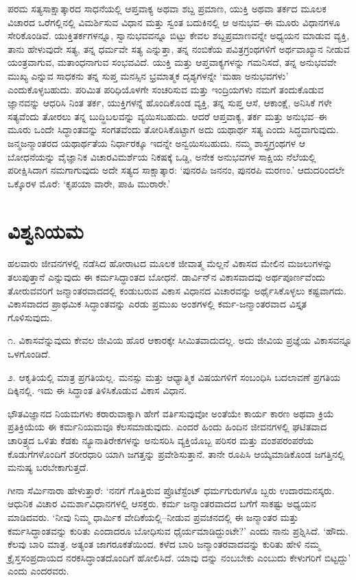 ಪರಮ ಸತ್ಯಸಾಕ್ಷಾತ್ಕಾರದ ಸಾಧನೆಯಲ್ಲಿ ಆಪ್ತವಾಕ್ಯ ಅಥವಾ ಶಬ್ದ ಪ್ರಮಾಣ, ಯುಕ್ತಿ ಅಥವಾ ತರ್ಕದ ಮೂಲಕ ವಿಚಾರದ ಒರೆಗಲ್ಲಿನಲ್ಲಿ ವಿಮರ್ಶಿಸುವ ವಿಧಾನ ಮತ್ತು ಸ್ವಂತ ಬದುಕಿನಲ್ಲಿ ಆ ಅನುಭವ–ಈ ಮೂರು ವಿಧಾನಗಳೂ ಸೇರಿಕೊಂಡಿವೆ. ಯುಕ್ತಿತರ್ಕಗಳನ್ನೂ, ಸ್ವಾನುಭವವನ್ನೂ ಬಿಟ್ಟು ಕೇವಲ ಶಬ್ದಪ್ರಮಾಣವನ್ನೇ ಅಧ್ಯಯನ ಮಾಡುವ ವ್ಯಕ್ತಿ, ತಾನು ಹೇಳುವುದೇ ಸತ್ಯ, ತನ್ನ ಧರ್ಮವೇ ಸತ್ಯ ಎನ್ನುತ್ತಾ, ತನ್ನ ನಂಬಿಕೆಯ ಪವಿತ್ರಗ್ರಂಥಗಳಿಗೆ ಅರ್ಥವಾಖ್ಯಾನ ನೀಡುವ ಯಂತ್ರವಾಗುವ, ಮತಾಂಧನಾಗುವ ಸಂಭವವಿದೆ. ಯುಕ್ತಿ ಮತ್ತು ಆಪ್ತವಾಕ್ಯಗಳನ್ನು ಗಮನಿಸದೆ, ತನ್ನ ಅನುಭವವೇ ಮುಖ್ಯ ಎನ್ನುವ ಸಾಧಕನು ತನ್ನ ಸುಪ್ತ ಮನಸ್ಸಿನ ಭ್ರಮಾತ್ಮಕ ದೃಶ್ಯಗಳನ್ನೇ ‘ಮಹಾ ಅನುಭವಗಳು’ ಎಂದುಕೊಳ್ಳಬಹುದು. ಪರಿಮಿತ ಪರಿಧಿಯೊಳಗೇ ಸಂಚರಿಸುವ ಮತ್ತು ಇಂದ್ರಿಯಗಳು ನಮಗೆ ತಂದುಕೊಡುವ ಜ್ಞಾನವನ್ನು ಆಧರಿಸಿ ನಿಂತ ತರ್ಕ, ಯುಕ್ತಿಗಳನ್ನೆ ಹೊಂದಿಕೊಂಡ ವ್ಯಕ್ತಿ, ತನ್ನ ಸುಪ್ತ ಆಸೆ, ಆಕಾಂಕ್ಷೆ, ಅನಿಸಿಕೆ ಗಳೇ ಸತ್ಯವೆಂದು ತೋರಲು ತನ್ನ ಬುದ್ಧಿಬಲವನ್ನು ವ್ಯಯಿಸಬಹುದು. ಆದರೆ ಆಪ್ತವಾಕ್ಯ, ತರ್ಕ ಮತ್ತು ಅನುಭವ–ಈ ಮೂರು ಒಂದೇ ಸಿದ್ಧಾಂತವನ್ನು ಸಂಗತವೆಂದು ತೋರಿಸಿಕೊಟ್ಟಾಗ ಅದು ಯಥಾರ್ಥ ಸತ್ಯ ಎಂದು ಸಿದ್ಧವಾಗುವುದು. ಜನ್ಮಜನ್ಮಾಂತರದ ಯಥಾರ್ಥತೆಯ ನಿರ್ಧಾರಕ್ಕೂ ಇದನ್ನೇ ಅನ್ವಯಿಸಬಹುದು. ನಮ್ಮ ಶಾಸ್ತ್ರಗ್ರಂಥಗಳ ಆ ಬೋಧನೆಯನ್ನು ವೈಜ್ಞಾನಿಕ ವಿಚಾರವಿಮರ್ಶೆಯ ನಿಕಷಕ್ಕೆ ಒಡ್ಡಿ, ಅನೇಕ ಅನುಭವಗಳ ಸಾಕ್ಷಿಯ ನೆಲೆಯಲ್ಲಿ ಪರೀಕ್ಷಿಸಿದಾಗ ನಮಗಾಗುವುದು ಅದೇ ಸತ್ಯದ ಸಾಕ್ಷಾತ್ಕಾರ: ‘ಪುನರಪಿ ಜನನಂ, ಪುನರಪಿ ಮರಣಂ.’ ಆದುದರಿಂದಲೇ ಒಕ್ಕೊರಳ ಮೊರೆ: ‘ಕೃಪಯಾ ವಾರೇ, ಪಾಹಿ ಮುರಾರೇ.’


\section{ವಿಶ್ವನಿಯಮ}

ಹಲವಾರು ಜೀವನಗಳಲ್ಲಿ ನಡೆಸಿದ ಹೋರಾಟದ ಮೂಲಕ ಜೀವಾತ್ಮ ಮೆಲ್ಲನೆ ವಿಕಾಸದ ಮೇಲಿನ ಮಜಲುಗಳನ್ನು ತಲುಪುತ್ತಾನೆ ಎನ್ನುವುದು ಈ ಕರ್ಮಸಿದ್ಧಾಂತದ ಬೋಧನೆ. ಡಾರ್ವಿನ್​ನ ವಿಕಾಸವಾದವು ಅರ್ಥಪೂರ್ಣವೆಂದು ತೋರುವವರಿಗೆ ಜನ್ಮಾಂತರವಾದದಲ್ಲಿ ಕಂಡುಬರುವ ವಿಕಾಸ ವಿಧಾನದ ವಿಚಾರವನ್ನು ಅರ್ಥೈಸಿಕೊಳ್ಳಲು ಕಷ್ಟವಾಗದು. ವಿಕಾಸವಾದದ ಪ್ರಾಥಮಿಕ ಸಿದ್ಧಾಂತವನ್ನು ಎರಡು ಪ್ರಮುಖ ಅಂಶಗಳಲ್ಲಿ ಕರ್ಮ-ಜನ್ಮಾಂತರವಾದ ವಿಸ್ತೃತ ಗೊಳಿಸುವುದು.

೧. ವಿಕಾಸವೆನ್ನುವುದು ಕೇವಲ ಜೀವಿಯ ಹೊರ ಆಕಾರಕ್ಕೇ ಸೀಮಿತವಾದುದಲ್ಲ. ಅದು ಜೀವಿಯ ಪ್ರಜ್ಞೆಯ ವಿಕಾಸವನ್ನೂ ಒಳಗೊಂಡಿದೆ.

೨. ಆಕೃತಿಯಲ್ಲಿ ಮಾತ್ರ ಪ್ರಗತಿಯಲ್ಲ. ಮನಸ್ಸು ಮತ್ತು ಆಧ್ಯಾತ್ಮಿಕ ವಿಷಯಗಳಿಗೆ ಸಂಬಂಧಿಸಿ ಬದಲಾವಣೆ ಪ್ರಗತಿಯ ದಿಕ್ಕಿನಲ್ಲಿ. ಇದು ಈ ಸಿದ್ಧಾಂತ ತಿಳಿಸಿಕೊಡುವ ವಿಕಾಸ ವಿಧಾನ.

ಭೌತವಿಜ್ಞಾನದ ನಿಯಮಗಳು ಕರಾರುವಾಕ್ಕಾಗಿ ಹೇಗೆ ವರ್ತಿಸುವುವೋ ಅಂತೆಯೇ ಕಾರ್ಯ ಕಾರಣ ಅಥವಾ ಕ್ರಿಯೆ ಪ್ರತಿಕ್ರಿಯೆಯ ಈ ಕರ್ಮನಿಯಮವೂ ಕೆಲಸಮಾಡುವುದು. ಎಂದರೆ ಹಿಂದು ಹಿಂದಿನ ಜೀವನಗಳಲ್ಲಿ ಘಟಿತವಾದ ಚಾರಿತ್ರ್ಯದ ಒಳಿತು ಕೆಡಕು ನ್ಯೂನಾತಿರೇಕಗಳನ್ನು ಅನುಸರಿಸಿ ವ್ಯಕ್ತಿಯೊಬ್ಬ ಪರಿಸರ ಮತ್ತು ವಂಶಪರಂಪರೆಯ ಕೊಡುಗೆಗಳೊಂದಿಗೆ ಶರೀರಧಾರಿ ಯಾಗಿ ಜಗತ್ತನ್ನು ಪ್ರವೇಶಿಸುತ್ತಾನೆ. ತಾನೇ ರೂಪಿಸಿ ಆಯ್ಕೆಮಾಡಿಕೊಂಡ ಜಗತ್ತಿನಲ್ಲಿ ಮನುಷ್ಯ ಬರಬೇಕಾಗುತ್ತದೆ.

ಗೀನಾ ಸೆರ್ಮಿನಾರಾ ಹೇಳುತ್ತಾರೆ: ‘ನನಗೆ ಗೊತ್ತಿರುವ ಪ್ರೊಟೆಸ್ಟೆಂಟ್ ಧರ್ಮಗುರುಗಳೊ ಬ್ಬರು ಉದಾರಮನಸ್ಕರು. ಆಧುನಿಕ ವಿಚಾರ ವಿಮರ್ಶಾವಿಧಾನಗಳಲ್ಲಿ ಆಸಕ್ತರು. ಕರ್ಮ ಜನ್ಮಾಂತರವಾದದ ಬಗೆಗೆ ಸಾಕಷ್ಟು ಅಧ್ಯಯನ ಮಾಡಿದವರು. ‘ನೀವು ನಿಮ್ಮ ಧಾರ್ಮಿಕ ವೇದಿಕೆಯಲ್ಲಿ–ನೀಡುವ ಪ್ರವಚನದಲ್ಲಿ ಈ ಜನ್ಮಾಂತರ ಮತ್ತು ಕರ್ಮಸಿದ್ಧಾಂತವನ್ನು ಕುರಿತು ಎಂದಾದರೂ ಬೋಧಿಸುವ ಧೈರ್ಯಮಾಡಿದ್ದುಂಟೇ?’ ಎಂದು ನಾನು ಪ್ರಶ್ನಿಸಿದೆ. ‘ಹೌದು. ಕೆಲವು ಬಾರಿ ಮಾತ್ರ. ಅತ್ಯಂತ ಜಾಗರೂಕತೆಯಿಂದ. ಕಳೆದ ಬಾರಿ ಜನ್ಮಾಂತರವಾದವನ್ನು ಕುರಿತು ಹೇಳಿ ನಮ್ಮ ಕ್ರೈಸ್ತಸಂಪ್ರದಾಯದ ನರಕಸಿದ್ಧಾಂತದೊಂದಿಗೆ ಹೋಲಿಸಿದೆ. ಯಾವು ದನ್ನು ನಂಬಬೇಕು ಎಂಬುದು ಕೇಳುಗರಿಗೆ ಬಿಟ್ಟದ್ದು’ ಎಂದು ಎಂದರವರು.


